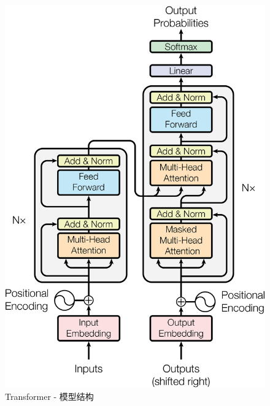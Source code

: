 
\begin{figure}
  \centering
  \includegraphics[scale=0.6]{Figures/ModalNet-21}
  \caption{Transformer - 模型结构}
  \label{fig:model-arch}
\end{figure}


